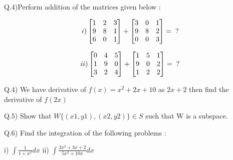 \documentclass[16pt]{article}
\begin{document}
\begin{flushleft}
Q.4)Perform addition of the matrices given below :
\linebreak

\[i)
\begin{bmatrix}
1 & 2 & 3 \\
9 & 8 & 1 \\
6 & 0 & 1 \\
\end{bmatrix}
+ 
\begin{bmatrix}
3 & 0 & 1 \\
9 & 8 & 2 \\
0 & 0 & 3 \\
\end{bmatrix} = \hspace{0.2cm}?  
\]

	\[ii)
\begin{bmatrix}
0 & 4 & 5 \\
1 & 9 & 0 \\
3 & 2 & 4 \\
\end{bmatrix}
+ 
\begin{bmatrix}
1 & 5 & 1 \\
9 & 0 & 2 \\
1 & 2 & 2 \\
\end{bmatrix} = \hspace{0.2cm}?
\]

	
	
\end{flushleft}

\begin{flushleft}
Q.4) We have derivative of $f(x) = x^2 + 2x + 10$ as $2x + 2$ then find the derivative of $f(2x)$
\end{flushleft}
\begin{flushleft}
Q.5) Show that $W\{(x1,y1),(x2,y2)\}\in S $ such that W is a subspace.

\end{flushleft}
\begin{flushleft}
Q.6) Find the integration of the following problems :
\linebreak
\begin{LARGE}
i) $\int \frac{1}{1+x^2}dx$
\hspace{1cm}
ii) $\int \frac{2x^2 + 3x + 2}{5x^2 + 10x}dx$
\end{LARGE} 
\end{flushleft}
\end{document}
